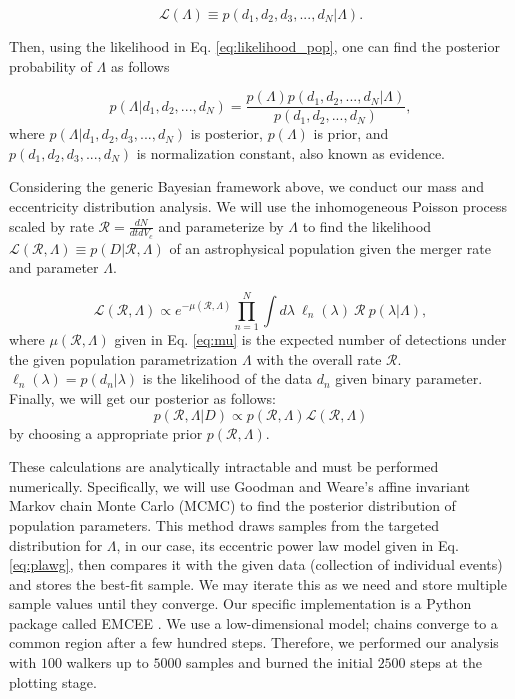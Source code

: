 \documentclass[twocolumn,prd,nofootinbib]{revtex4}
\begin{document}
\begin{equation}
\label{eq:likelihood_pop}    
\mathcal{L}(\Lambda)\equiv p(d_1,d_2,d_3,...,d_N|\Lambda).
\end{equation}

 

Then, using the likelihood in Eq. \ref{eq:likelihood_pop}, one can find the posterior probability of $\Lambda$ as follows

\begin{equation}
\label{eq:Bayes}    
p(\Lambda|d_1,d_2,...,d_N)= \frac{p(\Lambda)p(d_1,d_2,...,d_N|\Lambda)}{p(d_1,d_2,...,d_N)},
\end{equation}
%
where $p(\Lambda|d_1,d_2,d_3,...,d_N)$ is posterior, $p(\Lambda)$ is prior, and $p(d_1,d_2,d_3,...,d_N)$ is 
normalization constant, also known as evidence.

Considering the generic Bayesian framework above, we conduct our mass and eccentricity distribution analysis. We will use the inhomogeneous Poisson process
\cite{2019MNRAS.486.1086M, 2004AIPC..735..195L}
scaled by rate $\mathcal{R} = \frac{dN}{dtdV_c}$ and parameterize by $\Lambda$ to find the likelihood 
$\mathcal{L}(\mathcal{R},\Lambda)\equiv p(D|\mathcal{R},\Lambda)$ of an astrophysical population given the
merger rate and parameter $\Lambda$. 

\begin{equation}
\label{eq: likelihood}
\mathcal{L}(\mathcal{R},\Lambda) \propto e^{-\mu(\mathcal{R},\Lambda)} \prod_{n=1}^N\int d\lambda~\ell_n(\lambda)~
\mathcal{R}~ p(\lambda|\Lambda),
\end{equation}
%
where $\mu(\mathcal{R},\Lambda)$ given in Eq. \ref{eq:mu} is the expected number of detections under the given population parametrization 
$\Lambda$ with the overall rate $\mathcal{R}$. $\ell_n(\lambda)=p(d_n|\lambda)$ is the likelihood of the data 
$d_n$ given binary parameter.
Finally, we will get our posterior as follows:
\begin{equation}
p(\mathcal{R},\Lambda | D)\propto p(\mathcal{R},\Lambda)  \mathcal{L}(\mathcal{R},\Lambda)  
\end{equation}
by choosing a appropriate prior $p(\mathcal{R},\Lambda)$.

These calculations are analytically intractable and must be performed numerically. Specifically, we will use 
Goodman and Weare's affine invariant Markov chain Monte Carlo (MCMC) \cite{mcmc_paper} to find the posterior 
distribution of population parameters. This method draws samples from the targeted distribution for $\Lambda$, 
in our case, its eccentric power law model given in Eq. \ref{eq:plawg}, then compares it with the given data 
(collection of individual events) and stores the best-fit sample. We may iterate this as we need and store 
multiple sample values until they converge. 
Our specific implementation is a Python package called EMCEE \cite{emcee_paper}. We use a low-dimensional 
model; chains converge to a common region after a few hundred steps. Therefore, we performed our analysis 
with $100$ walkers up to $5000$ samples and burned the initial $2500$ steps at the plotting stage. 
\end{document}
